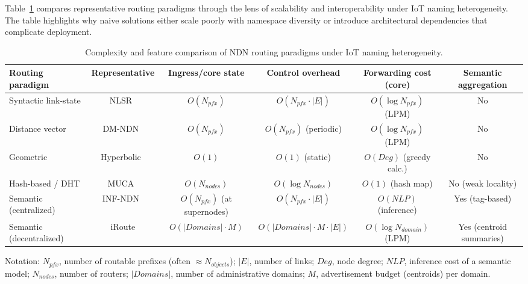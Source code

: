 \documentclass[journal]{IEEEtran}
\begin{document}
Table~\ref{tab:complexity} compares representative routing paradigms through the lens of scalability and interoperability under IoT naming heterogeneity. The table highlights why naive solutions either scale poorly with namespace diversity or introduce architectural dependencies that complicate deployment.

\begin{table}[t]
\centering
\caption{Complexity and feature comparison of NDN routing paradigms under IoT naming heterogeneity.}
\label{tab:complexity}

\footnotesize
\setlength{\tabcolsep}{4pt}
\renewcommand{\arraystretch}{1.35}

\begin{tabular*}{\textwidth}{@{\extracolsep{\fill}}lccccc@{}}
\toprule
Routing paradigm &
Representative &
Ingress/core state &
Control overhead &
Forwarding cost (core) &
Semantic aggregation \\
\midrule

Syntactic link-state &
NLSR~\cite{nlsr} &
$O(N_{pfx})$ &
$O(N_{pfx}\!\cdot\!|E|)$ &
$O(\log N_{pfx})$ (LPM) &
No \\

Distance vector &
DM-NDN~\cite{distance_vector} &
$O(N_{pfx})$ &
$O(N_{pfx})$ (periodic) &
$O(\log N_{pfx})$ (LPM) &
No \\

Geometric &
Hyperbolic~\cite{hyperbolic} &
$O(1)$ &
$O(1)$ (static) &
$O(Deg)$ (greedy calc.) &
No \\

Hash-based / DHT &
MUCA~\cite{muca} &
$O(N_{nodes})$ &
$O(\log N_{nodes})$ &
$O(1)$ (hash map) &
No (weak locality) \\

Semantic (centralized) &
INF-NDN~\cite{inf_ndn_iot} &
$O(N_{pfx})$ (at supernodes) &
$O(N_{pfx}\!\cdot\!|E|)$ &
$O(NLP)$ (inference) &
Yes (tag-based) \\

Semantic (decentralized) &
iRoute &
$O(|Domains|\!\cdot\!M)$ &
$O(|Domains|\!\cdot\!M\!\cdot\!|E|)$ &
$O(\log N_{domain})$ (LPM) &
Yes (centroid summaries) \\
\bottomrule
\end{tabular*}

\vspace{2pt}
\begin{minipage}{\textwidth}
\scriptsize
Notation:
$N_{pfx}$, number of routable prefixes (often $\approx N_{objects}$);
$|E|$, number of links;
$Deg$, node degree;
$NLP$, inference cost of a semantic model;
$N_{nodes}$, number of routers;
$|Domains|$, number of administrative domains;
$M$, advertisement budget (centroids) per domain.
\end{minipage}

\vspace{-2mm}
\end{table}
\end{document}
